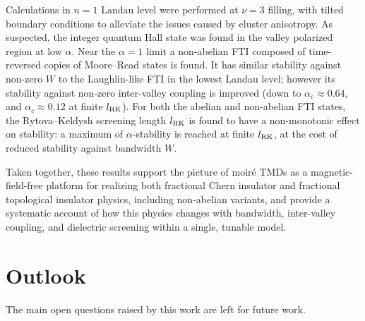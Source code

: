 Calculations in $n=1$ Landau level were performed at $\nu=3$ filling, with tilted boundary conditions to alleviate the issues caused by cluster anisotropy. As suspected, the integer quantum Hall state was found in the valley polarized region at low $\alpha$. Near the $\alpha = 1$ limit a non-abelian FTI composed of time-reversed copies of Moore--Read states is found. It has similar stability against non-zero $W$ to the Laughlin-like FTI in the lowest Landau level; however its stability against non-zero inter-valley coupling is improved (down to $\alpha_c \approx 0.64$, and $\alpha_c \approx 0.12$ at finite $l_{\rm RK}$). For both the abelian and non-abelian FTI states, the Rytova--Keldysh screening length $l_{\rm RK}$ is found to have a non-monotonic effect on stability: a maximum of $\alpha$-stability is reached at finite $l_{\rm RK}$, at the cost of reduced stability against bandwidth $W$.

Taken together, these results support the picture of moir\'e TMDs as a magnetic-field-free platform for realizing both fractional Chern insulator and fractional topological insulator physics, including non-abelian variants, and provide a systematic account of how this physics changes with bandwidth, inter-valley coupling, and dielectric screening within a single, tunable model.

\section{Outlook}

The main open questions raised by this work are left for future work.

